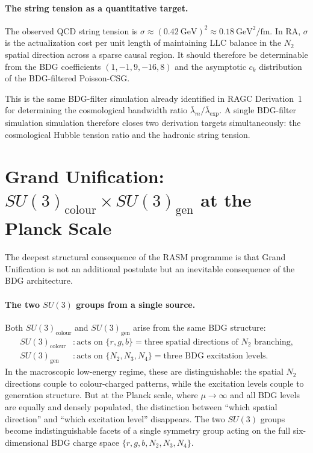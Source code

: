 \documentclass[11pt,a4paper]{article}
\begin{document}
\paragraph{The string tension as a quantitative target.}
The observed QCD string tension is $\sigma \approx (0.42~\text{GeV})^2
\approx 0.18~\text{GeV}^2/\text{fm}$. In RA, $\sigma$ is the actualization
cost per unit length of maintaining LLC balance in the $N_2$ spatial direction
across a sparse causal region. It should therefore be determinable from the
BDG coefficients $(1, -1, 9, -16, 8)$ and the asymptotic $c_k$ distribution
of the BDG-filtered Poisson-CSG.

This is the same BDG-filter simulation already identified in RAGC
Derivation~1~\citep{Sandeman2026RAGC} for determining the cosmological
bandwidth ratio $\bar\lambda_m/\bar\lambda_\text{exp}$. A single BDG-filter simulation
simulation therefore closes two derivation targets simultaneously: the
cosmological Hubble tension ratio and the hadronic string tension.

\section{Grand Unification: $SU(3)_{\mathrm{colour}} \times SU(3)_{\mathrm{gen}}$
at the Planck Scale}
\label{sec:gut}

The deepest structural consequence of the RASM programme is that Grand
Unification is not an additional postulate but an inevitable consequence
of the BDG architecture.

\paragraph{The two $SU(3)$ groups from a single source.}
Both $SU(3)_{\mathrm{colour}}$ and $SU(3)_{\mathrm{gen}}$ arise from the
same BDG structure:
\begin{align}
  SU(3)_{\mathrm{colour}} &: \text{acts on } \{r, g, b\}
  = \text{three spatial directions of } N_2 \text{ branching,} \\
  SU(3)_{\mathrm{gen}} &: \text{acts on } \{N_2, N_3, N_4\}
  = \text{three BDG excitation levels.}
\end{align}
In the macroscopic low-energy regime, these are distinguishable: the spatial
$N_2$ directions couple to colour-charged patterns, while the excitation
levels couple to generation structure. But at the Planck scale, where
$\mu \to \infty$ and all BDG levels are equally and densely populated, the
distinction between ``which spatial direction'' and ``which excitation level''
disappears. The two $SU(3)$ groups become indistinguishable facets of a
single symmetry group acting on the full six-dimensional BDG charge space
$\{r, g, b, N_2, N_3, N_4\}$.
\end{document}
